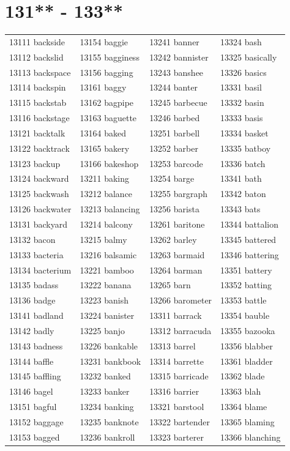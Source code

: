 \documentclass[10pt, oneside]{book}
\begin{document}
\begin{table}
	\centering
	\section*{131** - 133**}
	\begin{tabular}{l l l l}
13111 backside &13154 baggie &13241 banner &13324 bash\\
13112 backslid &13155 bagginess &13242 bannister &13325 basically\\
13113 backspace &13156 bagging &13243 banshee &13326 basics\\
13114 backspin &13161 baggy &13244 banter &13331 basil\\
13115 backstab &13162 bagpipe &13245 barbecue &13332 basin\\
13116 backstage &13163 baguette &13246 barbed &13333 basis\\
13121 backtalk &13164 baked &13251 barbell &13334 basket\\
13122 backtrack &13165 bakery &13252 barber &13335 batboy\\
13123 backup &13166 bakeshop &13253 barcode &13336 batch\\
13124 backward &13211 baking &13254 barge &13341 bath\\
13125 backwash &13212 balance &13255 bargraph &13342 baton\\
13126 backwater &13213 balancing &13256 barista &13343 bats\\
13131 backyard &13214 balcony &13261 baritone &13344 battalion\\
13132 bacon &13215 balmy &13262 barley &13345 battered\\
13133 bacteria &13216 balsamic &13263 barmaid &13346 battering\\
13134 bacterium &13221 bamboo &13264 barman &13351 battery\\
13135 badass &13222 banana &13265 barn &13352 batting\\
13136 badge &13223 banish &13266 barometer &13353 battle\\
13141 badland &13224 banister &13311 barrack &13354 bauble\\
13142 badly &13225 banjo &13312 barracuda &13355 bazooka\\
13143 badness &13226 bankable &13313 barrel &13356 blabber\\
13144 baffle &13231 bankbook &13314 barrette &13361 bladder\\
13145 baffling &13232 banked &13315 barricade &13362 blade\\
13146 bagel &13233 banker &13316 barrier &13363 blah\\
13151 bagful &13234 banking &13321 barstool &13364 blame\\
13152 baggage &13235 banknote &13322 bartender &13365 blaming\\
13153 bagged &13236 bankroll &13323 barterer &13366 blanching\\
	\end{tabular}
 \end{table}
\clearpage
\end{document}
